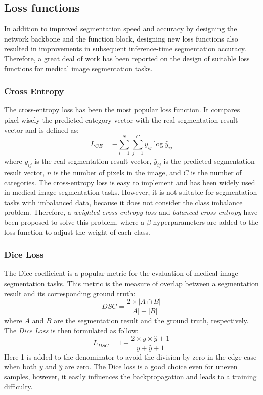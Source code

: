 \subsection{Loss functions}
In addition to improved segmentation speed and accuracy
by designing the network backbone and the function block, designing new loss
functions also resulted in improvements in subsequent inference-time
segmentation accuracy. Therefore,
a great deal of work has been reported on the design of
suitable loss functions for medical image segmentation tasks.

\subsubsection{Cross Entropy}
The cross-entropy loss has been the most popular loss function. It compares
pixel-wisely the predicted category vector with the real segmentation result
vector and is defined as:
$$
L_{CE} = -\sum_{i=1}^{N} \sum_{j=1}^{C} y_{ij} \log \hat{y}_{ij}
$$
where $y_{ij}$ is the real segmentation result vector, $\hat{y}_{ij}$ is the
predicted segmentation result vector, $n$ is the number of pixels in the image,
and $C$ is the number of categories. The cross-entropy loss is easy to
implement and has been widely used in medical image segmentation tasks. However,
it is not suitable for segmentation tasks with imbalanced data, because it does
not consider the class imbalance problem. Therefore, a \emph{weighted cross
entropy loss} and \emph{balanced cross entropy} have been proposed to solve this
problem, where a $\beta$ hyperparameters are added to the loss function to adjust
the weight of each class.

\subsubsection{Dice Loss}
The Dice coefficient is a popular metric for the evaluation of medical image
segmentation tasks. This metric is the measure of overlap between a segmentation
result and its corresponding ground truth:
$$
DSC = \frac{2 \times |A \cap B|}{|A| + |B|}
$$
where $A$ and $B$ are the segmentation result and the ground truth,
respectively. The \emph{Dice Loss} is then formulated as follow:
$$
L_{DSC} = 1 - \frac{2 \times y \times \hat{y} + 1}{y + \hat{y} + 1}
$$
Here 1 is added to the denominator to avoid the division by zero in the edge
case when both $y$ and $\hat{y}$ are zero. The Dice loss is a good choice even
for uneven samples, however, it easily influences the backpropagation and leads
  to a training difficulty.

